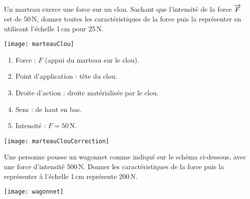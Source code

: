 \begin{exercice}
Un marteau exerce une force sur un clou. Sachant que l'intensité de la force $\overrightarrow{F}$ est de 50\,N, donner toutes les caractéristiques de la force puis la représenter en utilisant l'échelle 1\,cm pour 25\,N.

\vspace{1em}
\begin{center}
    \texttt{[image: marteauClou]}
\end{center}

\end{exercice}


\begin{corrige}
\begin{enumerate}
\item Force : $F$ (appui du marteau sur le clou).
\item Point d'application : tête du clou.
\item Droite d'action : droite matérialisée par le clou.
\item Sens : de haut en bas.
\item Intensité : $F=50$\,N. 
\end{enumerate}

\begin{center}
    \texttt{[image: marteauClouCorrection]}
\end{center}

\end{corrige}








\begin{exercice}
Une personne pousse un wagonnet comme indiqué sur le schéma ci-dessous, avec une force d'intensité 500\,N. Donner les caractéristiques de la force puis la représenter à l'échelle 1\,cm représente 200\,N.

\vspace{1em}
\begin{center}
    \texttt{[image: wagonnet]}
\end{center}

\end{exercice}



